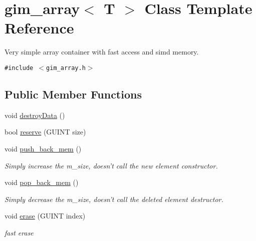 \hypertarget{classgim__array}{
\section{gim\_\-array$<$ T $>$ Class Template Reference}
\label{classgim__array}
}
Very simple array container with fast access and simd memory.  


{\tt \#include $<$gim\_\-array.h$>$}

\subsection*{Public Member Functions}
\begin{Indent}{\bf }\par
\begin{CompactItemize}
\item 
void \hyperlink{classgim__array_a7a9dca42674415635846cd077cb4a97}{destroyData} ()
\end{CompactItemize}
\end{Indent}
\begin{Indent}{\bf }\par
\begin{CompactItemize}
\item 
bool \hyperlink{classgim__array_572f94b5b67d505335150a2dea8a7e3d}{reserve} (GUINT size)
\item 
\hypertarget{classgim__array_cbd3ad9a6756d0b91e42549a0e7107f0}{
void \hyperlink{classgim__array_cbd3ad9a6756d0b91e42549a0e7107f0}{push\_\-back\_\-mem} ()}
\label{classgim__array_cbd3ad9a6756d0b91e42549a0e7107f0}

\begin{CompactList}\small\item\em Simply increase the m\_\-size, doesn't call the new element constructor. \item\end{CompactList}\item 
\hypertarget{classgim__array_a15906909f6f824e559864359096db63}{
void \hyperlink{classgim__array_a15906909f6f824e559864359096db63}{pop\_\-back\_\-mem} ()}
\label{classgim__array_a15906909f6f824e559864359096db63}

\begin{CompactList}\small\item\em Simply decrease the m\_\-size, doesn't call the deleted element destructor. \item\end{CompactList}\item 
\hypertarget{classgim__array_0de98d5b161c18568c7bc3a13e90df51}{
void \hyperlink{classgim__array_0de98d5b161c18568c7bc3a13e90df51}{erase} (GUINT index)}
\label{classgim__array_0de98d5b161c18568c7bc3a13e90df51}

\begin{CompactList}\small\item\em fast erase \item\end{CompactList}\end{CompactItemize}
\end{Indent}
